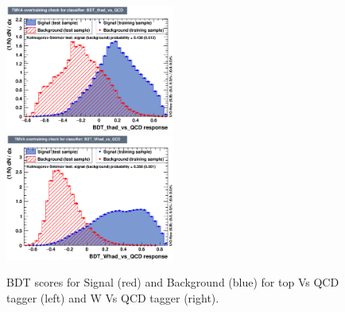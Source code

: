 \documentclass{cernrep}
\begin{document}
\begin{figure}[!htb]\centering
\includegraphics[width=0.495\textwidth]{Fig/TMVA/thad_vs_QCD/overtrain_BDT_thad_vs_QCD.eps}
\includegraphics[width=0.495\textwidth]{Fig/TMVA/Whad_vs_QCD/overtrain_BDT_Whad_vs_QCD.eps}
\caption{BDT scores for Signal (red) and Background (blue) for top Vs QCD tagger (left) and W Vs QCD tagger (right).}
\label{fig:TMVA_BDTscore}
\end{figure}
\end{document}
